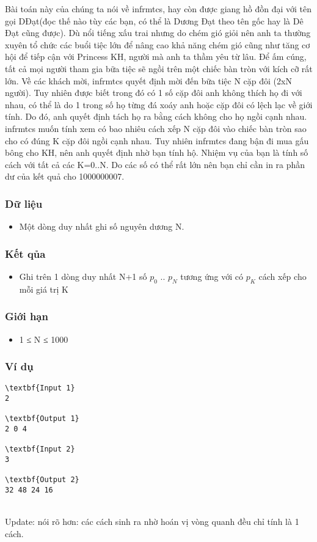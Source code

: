

Bài toán này của chúng ta nói về infrmtcs, hay còn được giang hồ đồn đại với tên gọi DĐạt(đọc thế nào tùy các bạn, có thể là Dương Đạt theo tên gốc hay là Dê Đạt cũng được). Dù nổi tiếng xấu trai nhưng do chém gió giỏi nên anh ta thường xuyên tổ chức các buổi tiệc lớn để nâng cao khả năng chém gió cũng như tăng cơ hội để tiếp cận với Princess KH, người mà anh ta thầm yêu từ lâu. Để ấm cúng, tất cả mọi người tham gia bữa tiệc sẽ ngồi trên một chiếc bàn tròn với kích cỡ rất lớn. Về các khách mời, infrmtcs quyết định mời đến bữa tiệc N cặp đôi (2xN người). Tuy nhiên được biết trong đó có 1 số cặp đôi anh không thích họ đi với nhau, có thể là do 1 trong số họ từng đá xoáy anh hoặc cặp đôi có lệch lạc về giới tính. Do đó, anh quyết định tách họ ra bằng cách không cho họ ngồi cạnh nhau. infrmtcs muốn tính xem có bao nhiêu cách xếp N cặp đôi vào chiếc bàn tròn sao cho có đúng K cặp đôi ngồi cạnh nhau. Tuy nhiên infrmtcs đang bận đi mua gấu bông cho KH, nên anh quyết định nhờ bạn tính hộ. Nhiệm vụ của bạn là tính số cách với tất cả các K=0..N. Do các số có thể rất lớn nên bạn chỉ cần in ra phần dư của kết quả cho 1000000007.

\subsubsection{Dữ liệu}
\begin{itemize}
	\item Một dòng duy nhất ghi số nguyên dương N.
\end{itemize}

\subsubsection{Kết qủa}
\begin{itemize}
	\item Ghi trên 1 dòng duy nhất N+1 số $p_{0}$ .. $p_{N}$ tương ứng với có $p_{K}$ cách xếp cho mỗi giá trị K
\end{itemize}

\subsubsection{Giới hạn}
\begin{itemize}
	\item 1 ≤ N ≤ 1000
\end{itemize}

\subsubsection{Ví dụ}
\begin{verbatim}
\textbf{Input 1}
2

\textbf{Output 1}
2 0 4

\textbf{Input 2}
3

\textbf{Output 2}
32 48 24 16 \end{verbatim}


\\Update: nói rõ hơn: các cách sinh ra nhờ hoán vị vòng quanh đều chỉ tính là 1 cách.
